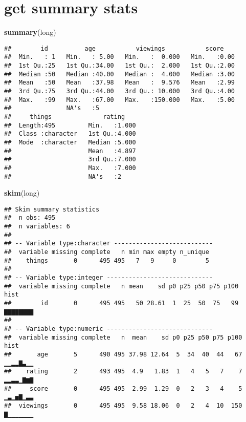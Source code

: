 \documentclass[]{article}
\newenvironment{Shaded}{\begin{snugshade}}{\end{snugshade}}
\newcommand{\KeywordTok}[1]{\textcolor[rgb]{0.13,0.29,0.53}{\textbf{#1}}}
\newcommand{\NormalTok}[1]{#1}
\begin{document}
\hypertarget{get-summary-stats}{%
\section{get summary stats}\label{get-summary-stats}}

\begin{Shaded}
\begin{Highlighting}[]
\KeywordTok{summary}\NormalTok{(long)}
\end{Highlighting}
\end{Shaded}

\begin{verbatim}
##        id          age           viewings           score     
##  Min.   : 1   Min.   : 5.00   Min.   :  0.000   Min.   :0.00  
##  1st Qu.:25   1st Qu.:34.00   1st Qu.:  2.000   1st Qu.:2.00  
##  Median :50   Median :40.00   Median :  4.000   Median :3.00  
##  Mean   :50   Mean   :37.98   Mean   :  9.576   Mean   :2.99  
##  3rd Qu.:75   3rd Qu.:44.00   3rd Qu.: 10.000   3rd Qu.:4.00  
##  Max.   :99   Max.   :67.00   Max.   :150.000   Max.   :5.00  
##               NA's   :5                                       
##     things              rating     
##  Length:495         Min.   :1.000  
##  Class :character   1st Qu.:4.000  
##  Mode  :character   Median :5.000  
##                     Mean   :4.897  
##                     3rd Qu.:7.000  
##                     Max.   :7.000  
##                     NA's   :2
\end{verbatim}

\begin{Shaded}
\begin{Highlighting}[]
\KeywordTok{skim}\NormalTok{(long) }
\end{Highlighting}
\end{Shaded}

\begin{verbatim}
## Skim summary statistics
##  n obs: 495 
##  n variables: 6 
## 
## -- Variable type:character ---------------------------
##  variable missing complete   n min max empty n_unique
##    things       0      495 495   7   9     0        5
## 
## -- Variable type:integer -----------------------------
##  variable missing complete   n mean    sd p0 p25 p50 p75 p100     hist
##        id       0      495 495   50 28.61  1  25  50  75   99 ▇▇▇▇▇▇▇▇
## 
## -- Variable type:numeric -----------------------------
##  variable missing complete   n  mean    sd p0 p25 p50 p75 p100     hist
##       age       5      490 495 37.98 12.64  5  34  40  44   67 ▁▁▂▂▇▃▁▁
##    rating       2      493 495  4.9   1.83  1   4   5   7    7 ▂▂▃▃▁▇▆▇
##     score       0      495 495  2.99  1.29  0   2   3   4    5 ▁▃▁▅▇▁▃▃
##  viewings       0      495 495  9.58 18.06  0   2   4  10  150 ▇▁▁▁▁▁▁▁
\end{verbatim}
\end{document}
